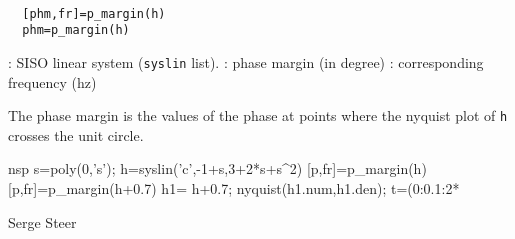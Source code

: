 \begin{mandesc}
   \\ %
\end{mandesc}
\begin{calling_sequence}
\begin{verbatim}
  [phm,fr]=p_margin(h)  
  phm=p_margin(h)  
\end{verbatim}
\end{calling_sequence}
\begin{parameters}
  \begin{varlist}
    : SISO linear system (\verb!syslin! list).
    : phase margin (in degree)
    : corresponding frequency (hz)
  \end{varlist}
\end{parameters}
\begin{mandescription}
  The phase margin is the values of the phase at points where the
  nyquist plot of \verb!h! crosses the unit circle.
\end{mandescription}
\begin{examples}
  \begin{mintednsp}{nsp}
    s=poly(0,'s');
    h=syslin('c',-1+s,3+2*s+s^2)  
    [p,fr]=p_margin(h)  
    [p,fr]=p_margin(h+0.7)  
    h1= h+0.7;
    nyquist(h1.num,h1.den);
    t=(0:0.1:2*%
  \end{mintednsp}
\end{examples}
\begin{manseealso}
    
     
\end{manseealso}
\begin{authors}
  Serge Steer
\end{authors}

